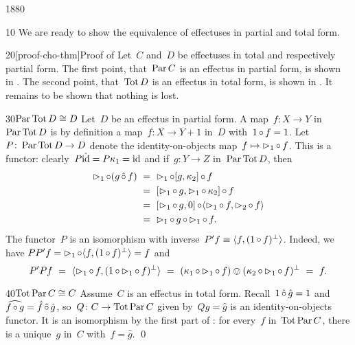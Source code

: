 \begin{parsec}{1880}%
\begin{point}{10}%
We are ready to show the equivalence of effectuses in partial and total form.
\begin{point}{20}[proof-cho-thm]{Proof of }%
Let~$C$ and~$D$ be effectuses in total and respectively partial form.
The first point, that~$\operatorname{Par} C$ is an effectus in partial form,
    is shown in .
The second point, that~$\operatorname{Tot} D$ is an effectus in total form,
    is shown in .
It remains to be shown that nothing is lost.
\begin{point}{30}{$\operatorname{Par} \operatorname{Tot} D \cong D$}%
Let~$D$ be an effectus in partial form.
A map~$f\colon X \to Y$ in~$\operatorname{Par} \operatorname{Tot} D$
    is by definition a map~$f\colon X \to Y+1$
        in~$D$ with~$1 \mathop{\circ} f= 1$.
Let~$P \colon \operatorname{Par} \operatorname{Tot} D \to D$
    denote the identity-on-objects map~$f \mapsto \mathord{\vartriangleright}_1 \mathop{\circ} f$.
This is a functor: clearly~$P\hat{\operatorname{id}} = P\kappa_1 = \operatorname{id} $ and
    if~$g\colon Y \to Z$ in~$\operatorname{Par}\operatorname{Tot} D$, then
\begin{align*}
    \pproj_1 \after (g \hafter f) & \ = \ 
    \pproj_1 \after [g, \kappa_2] \after f \\
    & \ = \ [\pproj_1 \after g, \pproj_1 \after \kappa_2] \after f \\
    & \ = \ [\pproj_1 \after g,  0] \after 
                \langle \pproj_1 \after f, \pproj_2 \after f\rangle \\
                & \ = \ \pproj_1 \after g  \after \pproj_1 \after f.
\end{align*}
The functor~$P$ is an isomorphism with inverse~$P' f \equiv \langle f, (1 \mathop{\circ} f)^\perp\rangle$.
Indeed, we have
    $P P' f = \mathord{\vartriangleright}_1 \mathop{\circ} \langle f, (1 \mathop{\circ} f)^\perp \rangle = f $
and
\begin{equation*}
    P' P f  \ =\  \langle \pproj_1 \after f, (1 \after \pproj_1 \after f)^\perp\rangle \ =\  (\kappa_1 \after \pproj_1 \after f) \ovee (\kappa_2 \after \pproj_1 \after f)^\perp\ =\  f.
\end{equation*}
\begin{point}{40}{$\operatorname{Tot} \operatorname{Par} C \cong C$}%
Assume~$C$ is an effectus in total form.
Recall~$1 \mathop{\hat\circ} \hat{g} = 1$
and~$\smash{\widehat{f \mathop{\circ} g}} = \hat{f} \mathop{\hat\circ} \hat{g}$,
    so~$Q\colon C \to \operatorname{Tot} \operatorname{Par} C$
    given by~$Q g = \hat{g}$ is an identity-on-objects functor.
It is an isomorphism by the first part of :
    for every~$f$ in~$\operatorname{Tot} \operatorname{Par} C$,
    there is a unique~$g$ in~$C$
    with~$f = \hat{g}$. \qed
\end{point}
\end{point}
\end{point}
\end{point}
\end{parsec}


